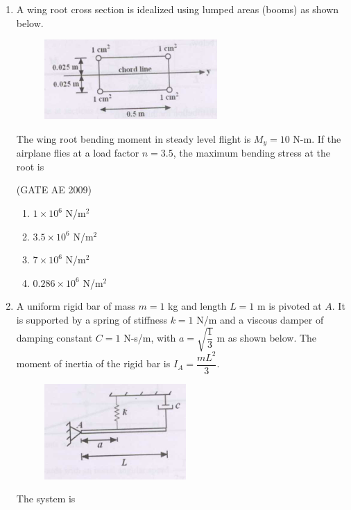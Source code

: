 \documentclass[journal,12pt,onecolumn]{IEEEtran}
\theoremstyle{remark}
\begin{document}
\begin{flushleft}
\begin{enumerate}
\begin{enumerate}
\end{enumerate}

\item A wing root cross section is idealized using lumped areas (booms) as shown below.

\begin{figure}[H]
    \centering
    \includegraphics[width=0.5\columnwidth]{figs/42.png}
    \caption{}
    \label{fig:placeholder}
\end{figure}

The wing root bending moment in steady level flight is $M_y = 10$ N-m. If the airplane flies at a load factor $n=3.5$, the maximum bending stress at the root is

\hfill(GATE AE 2009)

\begin{enumerate}
\item $1 \times 10^{6}$ N/m$^{2}$
\item $3.5 \times 10^{6}$ N/m$^{2}$
\item $7 \times 10^{6}$ N/m$^{2}$
\item $0.286 \times 10^{6}$ N/m$^{2}$
\end{enumerate}

\item A uniform rigid bar of mass $m=1$ kg and length $L=1$ m is pivoted at $A$. It is supported by a spring of stiffness $k=1$ N/m and a viscous damper of damping constant $C=1$ N-s/m, with $a=\sqrt{\dfrac{1}{3}}$ m as shown below. The moment of inertia of the rigid bar is $I_A = \dfrac{mL^{2}}{3}$.

\begin{figure}[H]
    \centering
    \includegraphics[width=0.5\columnwidth]{figs/43.png}
    \caption{}
    \label{fig:placeholder}
\end{figure}
The system is


\end{enumerate}
\end{flushleft}
\end{document}
